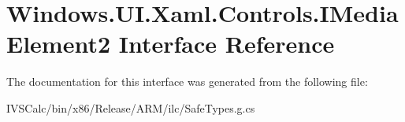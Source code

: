 \hypertarget{interface_windows_1_1_u_i_1_1_xaml_1_1_controls_1_1_i_media_element2}{}\section{Windows.\+U\+I.\+Xaml.\+Controls.\+I\+Media\+Element2 Interface Reference}
\label{interface_windows_1_1_u_i_1_1_xaml_1_1_controls_1_1_i_media_element2}


The documentation for this interface was generated from the following file\+:\begin{DoxyCompactItemize}
\item 
I\+V\+S\+Calc/bin/x86/\+Release/\+A\+R\+M/ilc/Safe\+Types.\+g.\+cs\end{DoxyCompactItemize}
